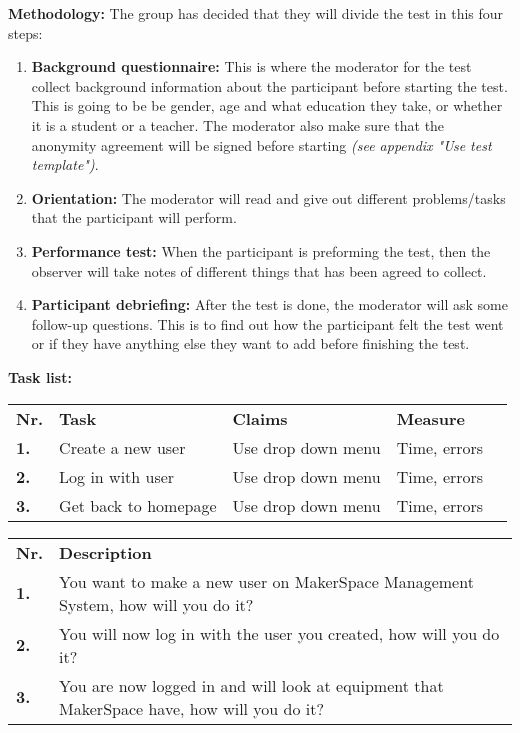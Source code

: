\textbf{Methodology:} 
The group has decided that they will divide the test in this four steps:
\begin{enumerate}
    \item \textbf{Background questionnaire:} This is where the moderator for the test collect background information about the participant before starting the test. This is going to be be gender, age and what education they take, or whether it is a student or a teacher. The moderator also make sure that the anonymity agreement will be signed before starting \textit{(see appendix "Use test template")}.
    
    \item \textbf{Orientation:} The moderator will read and give out different problems/tasks that the participant will perform.
    
    \item \textbf{Performance test:} When the participant is preforming the test, then the observer will take notes of different things that has been agreed to collect.
    
    \item \textbf{Participant debriefing:} After the test is done, the moderator will ask some follow-up questions. This is to find out how the participant felt the test went or if they have anything else they want to add before finishing the test.
\end{enumerate}
\textbf{Task list:}
\begin{table}[h]


\begin{tabular}{lllll}
 \textbf{Nr.} & \textbf{Task} & \textbf{Claims} & \textbf{
Measure}  \\
\textbf{1.} & Create a new user &  Use drop down menu & Time, errors \\
\textbf{2.} & Log in with user & Use drop down menu & Time, errors  \\
\textbf{3.} & Get back to homepage & Use drop down menu & Time, errors 
\end{tabular}
\end{table}

\begin{table}[h]
\begin{tabular}{ll}
\textbf{Nr.} & \textbf{Description} \\
\textbf{1.} & You want to make a new user on MakerSpace Management System, how will you do it? \\
\textbf{2.} & You will now log in with the user you created, how will you do it? \\
\textbf{3.} & You are now logged in and will look at equipment that MakerSpace have, how will you do it? 
\end{tabular}
\end{table} 

